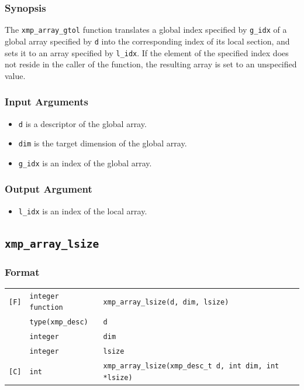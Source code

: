 \subsubsection*{Synopsis}

The {\tt xmp\_array\_gtol} function translates a global index specified
by {\tt g\_idx} of a global array specified by {\tt d} into the
corresponding index of its local section, and sets it to an array specified
by {\tt l\_idx}.  
If the element of the specified index does not reside in the caller of the function, 
the resulting array is set to an unspecified value.

\subsubsection*{Input Arguments}

\begin{itemize}
 \item {\tt d} is a descriptor of the global array.
 \item {\tt dim} is the target dimension of the global array.
 \item {\tt g\_idx} is an index of the global array.
\end{itemize}

\subsubsection*{Output Argument}

\begin{itemize}
 \item {\tt l\_idx} is an index of the local array.
\end{itemize}

\subsection{\tt xmp\_array\_lsize}\label{subsec:xmparraylsize}

\subsubsection*{Format}

\begin{tabular}{lll}

\verb![F]!& {\tt integer function}& {\tt xmp\_array\_lsize(d, dim, lsize)}\\
          & {\tt type(xmp\_desc)} & {\tt d}\\
          & {\tt integer} & {\tt dim}\\
          & {\tt integer} & {\tt lsize}\\

\verb![C]!&  {\tt int}& {\tt xmp\_array\_lsize(xmp\_desc\_t d, int dim, int *lsize)}\\

\end{tabular}

